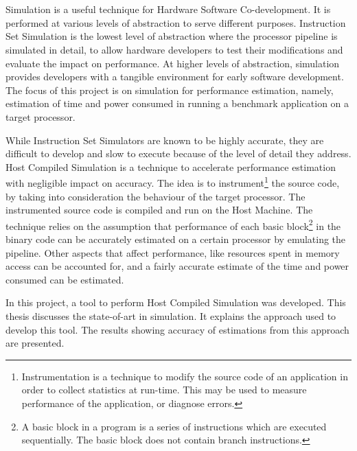 \chapter{\abstractname}

Simulation is a useful technique for Hardware Software Co-development. It is performed at various levels of abstraction to serve different purposes. Instruction Set Simulation is the lowest level of abstraction where the processor pipeline is simulated in detail, to allow hardware developers to test their modifications and evaluate the impact on performance. At higher levels of abstraction, simulation provides developers with a tangible environment for early software development. The focus of this project is on simulation for performance estimation, namely, estimation of time and power consumed in running a benchmark application on a target processor.

While Instruction Set Simulators are known to be highly accurate, they are difficult to develop and slow to execute because of the level of detail they address. Host Compiled Simulation is a technique to accelerate performance estimation with negligible impact on accuracy. The idea is to instrument\footnote{Instrumentation is a technique to modify the source code of an application in order to collect statistics at run-time. This may be used to measure performance of the application, or diagnose errors.} the source code, by taking into consideration the behaviour of the target processor. The instrumented source code is compiled and run on the Host Machine. The technique relies on the assumption that performance of each basic block\footnote{A basic block in a program is a series of instructions which are executed sequentially. The basic block does not contain branch instructions.} in the binary code can be accurately estimated on a certain processor by emulating the pipeline. Other aspects that affect performance, like resources spent in memory access can be accounted for, and a fairly accurate estimate of the time and power consumed can be estimated. 

In this project, a tool to perform Host Compiled Simulation was developed. This thesis discusses the state-of-art in simulation. It explains the approach used to develop this tool. The results showing accuracy of estimations from this approach are presented.
